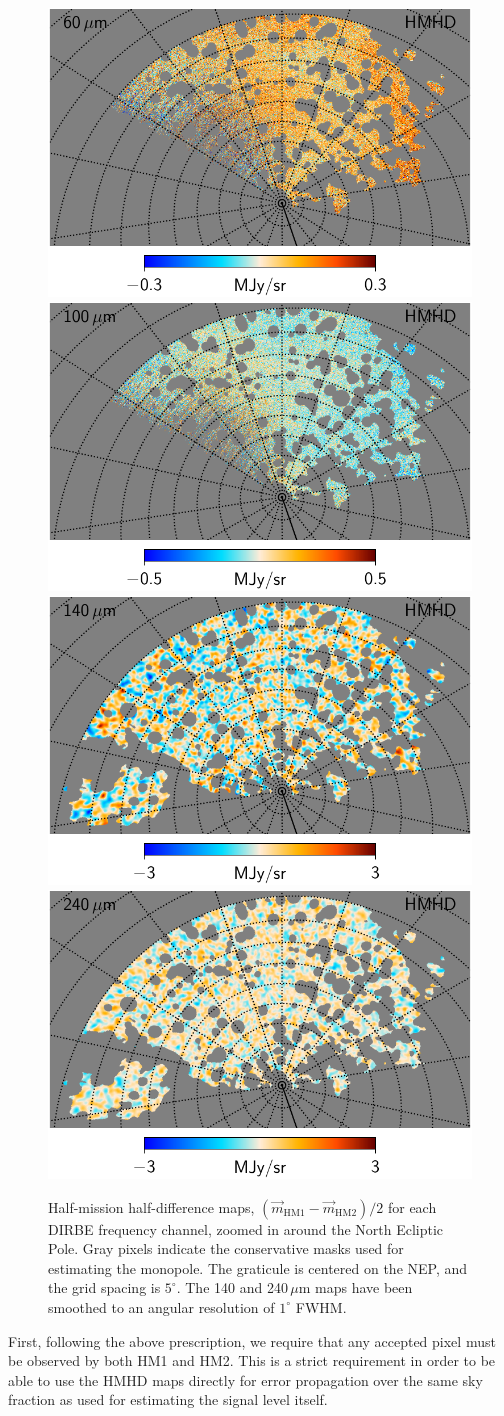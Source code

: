 \documentclass{aa}
\newcommand{\m}[0]{\vec{m}}
\begin{document}
\begin{figure}
  \includegraphics[width=0.376\linewidth]{figs/CGDR2_07_hmhd_fullres.pdf}\hspace*{5mm}
  \includegraphics[width=0.376\linewidth]{figs/CGDR2_08_hmhd_fullres.pdf}\\
  \includegraphics[width=0.376\linewidth]{figs/CGDR2_09_hmhd_fullres_1deg.pdf}\hspace*{5mm}
  \includegraphics[width=0.376\linewidth]{figs/CGDR2_10_hmhd_fullres_1deg.pdf}
  \caption{Half-mission half-difference maps, $(\m_{\mathrm{HM1}}-\m_{\mathrm{HM2}})/2$ for each DIRBE frequency channel, zoomed in around the North Ecliptic Pole. Gray pixels indicate the conservative masks used for estimating the monopole. The graticule is centered on the NEP, and the grid spacing is $5^{\circ}$. The 140 and 240\,$\mu\mathrm{m}$ maps have been smoothed to an angular resolution of $1^{\circ}$ FWHM.}
  \label{fig:hmhd_zoom}
\end{figure}

First, following the above prescription, we require that any
accepted pixel must be observed by both HM1 and HM2. This is a strict
requirement in order to be able to use the HMHD maps directly for
error propagation over the same sky fraction as used for estimating
the signal level itself. 
\end{document}
